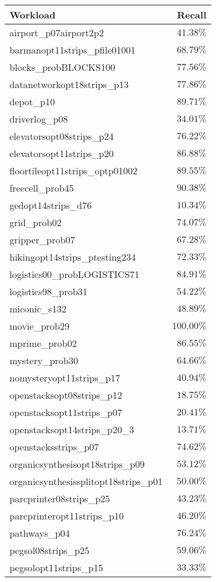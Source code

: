 \begin{tabular}{lr}
\toprule
Workload & Recall \\
\midrule
airport\_p07airport2p2 & $41.38\%$ \\
barmanopt11strips\_pfile01001 & $68.79\%$ \\
blocks\_probBLOCKS100 & $77.56\%$ \\
datanetworkopt18strips\_p13 & $77.86\%$ \\
depot\_p10 & $89.71\%$ \\
driverlog\_p08 & $34.01\%$ \\
elevatorsopt08strips\_p24 & $76.22\%$ \\
elevatorsopt11strips\_p20 & $86.88\%$ \\
floortileopt11strips\_optp01002 & $89.55\%$ \\
freecell\_prob45 & $90.38\%$ \\
gedopt14strips\_d76 & $10.34\%$ \\
grid\_prob02 & $74.07\%$ \\
gripper\_prob07 & $67.28\%$ \\
hikingopt14strips\_ptesting234 & $72.33\%$ \\
logistics00\_probLOGISTICS71 & $84.91\%$ \\
logistics98\_prob31 & $54.22\%$ \\
miconic\_s132 & $48.89\%$ \\
movie\_prob29 & $100.00\%$ \\
mprime\_prob02 & $86.55\%$ \\
mystery\_prob30 & $64.66\%$ \\
nomysteryopt11strips\_p17 & $40.94\%$ \\
openstacksopt08strips\_p12 & $18.75\%$ \\
openstacksopt11strips\_p07 & $20.41\%$ \\
openstacksopt14strips\_p20\_3 & $13.71\%$ \\
openstacksstrips\_p07 & $74.62\%$ \\
organicsynthesisopt18strips\_p09 & $53.12\%$ \\
organicsynthesissplitopt18strips\_p01 & $50.00\%$ \\
parcprinter08strips\_p25 & $43.23\%$ \\
parcprinteropt11strips\_p10 & $46.20\%$ \\
pathways\_p04 & $76.24\%$ \\
pegsol08strips\_p25 & $59.06\%$ \\
pegsolopt11strips\_p15 & $33.33\%$ \\

\end{tabular}
